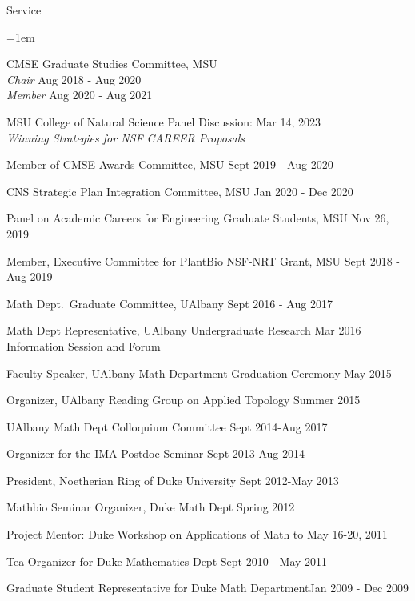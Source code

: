 \documentclass{resume} %
\begin{document}
\begin{rSection}{Service}
\begin{list}{}{\leftmargin=1em}
\item
CMSE Graduate Studies Committee, MSU\\
\phantom{xxx} \textit{Chair} \hfill  Aug 2018 - Aug 2020\\
\phantom{xxx} \textit{Member} \hfill  Aug 2020 - Aug 2021
\item MSU College of Natural Science Panel Discussion: \hfill Mar 14, 2023\\
\phantom{xxx}\textit{ Winning Strategies for NSF CAREER Proposals}
\item
Member of CMSE Awards Committee, MSU \hfill Sept 2019 - Aug 2020
\item
CNS Strategic Plan Integration Committee, MSU \hfill Jan 2020 - Dec 2020
\item
Panel on Academic Careers for Engineering Graduate Students, MSU \hfill Nov 26, 2019
\item Member, Executive Committee for PlantBio NSF-NRT Grant, MSU
\hfill Sept 2018 - Aug 2019

\item
Math Dept.~Graduate Committee, UAlbany \hfill Sept 2016 - Aug 2017
\item
Math Dept Representative, UAlbany Undergraduate Research  \hfill Mar 2016\\
\phantom{MMM}Information Session and Forum
\item
Faculty Speaker, UAlbany Math Department Graduation Ceremony \hfill May 2015
\item
{Organizer, UAlbany Reading Group on Applied Topology } \hfill Summer 2015
\item
{UAlbany Math Dept Colloquium Committee} \hfill Sept 2014-Aug 2017
\item
{Organizer for the IMA Postdoc Seminar} \hfill Sept 2013-Aug 2014
\item
{President, Noetherian Ring of Duke University} \hfill Sept 2012-May 2013
\item
{Mathbio Seminar Organizer, Duke Math Dept} \hfill Spring 2012
\item
{Project Mentor: Duke Workshop on Applications of Math to}
\hfill May 16-20, 2011\\
\phantom{MMM}{Physiology and Medicine}

\item
{Tea Organizer for Duke Mathematics Dept} \hfill Sept 2010 - May 2011
\item
{Graduate Student Representative for Duke Math Department}\hfill Jan 2009 - Dec 2009
\end{list}


\end{rSection}
\end{document}
